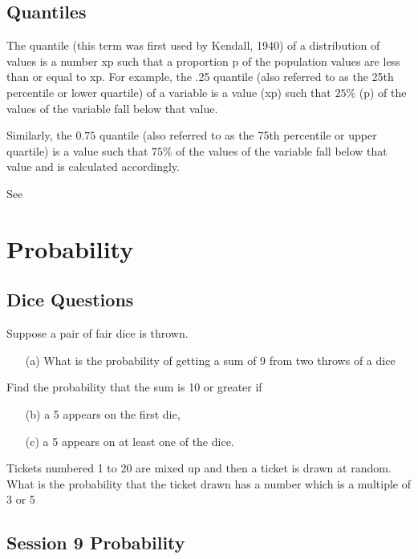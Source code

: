 \documentclass[12pt]{report}
\begin{document}
{{\section{Quantiles}

The quantile (this term was first used by Kendall, 1940) of a distribution of values is a number xp such that a proportion p of the population values are less than or equal to xp. For example, the .25 quantile (also referred to as the 25th percentile or lower quartile) of a variable is a value (xp) such that $25\%$ (p) of the values of the variable fall below that value.

Similarly, the $0.75$ quantile (also referred to as the 75th percentile or upper quartile) is a value such that $75\%$ of the values of the variable fall below that value and is calculated accordingly.

See






\chapter{Probability}
\section{Dice Questions}

Suppose a pair of fair dice is thrown. 
\begin{itemize}
	\item[(a)] What is the probability of getting a sum of 9 from two throws of a dice
\end{itemize}
Find the probability that the sum is 10 or greater if
\begin{itemize}
	\item[(b)] a 5 appears on the first die, 
	\item[(c)] a 5 appears on at least one of the dice.
\end{itemize}



Tickets numbered 1 to 20 are mixed up and then a ticket is drawn at random. What is the probability that the ticket drawn has a number which is a multiple of 3 or 5


\Large

		\section*{Session 9 Probability}

}}
\end{document}
